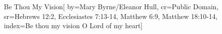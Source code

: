 {Be Thou My Vision}[
    by={Mary Byrne/Eleanor Hull},
    cr={Public Domain},
    sr={Hebrews 12:2, Ecclesiastes 7:13-14, Matthew 6:9, Matthew 18:10-14},
    index={Be thou my vision O Lord of my heart}]
